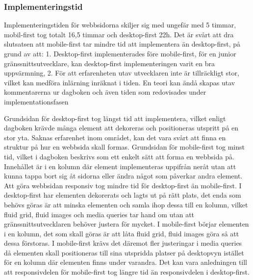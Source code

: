 \documentclass[11pt]{article}
\begin{document}
\subsubsection{Implementeringstid}
Implementeringstiden för webbsidorna skiljer sig med ungefär med 5 timmar, mobil-first tog totalt 16,5 timmar och desktop-first 22h. Det är svårt att dra slutsatsen att mobile-first tar mindre tid att implementera än desktop-first, på grund av att: 1. Desktop-first implementerades före mobile-first, för en junior gränssnittsutvecklare, kan desktop-first implementeringen varit en bra uppvärmning, 2. För att erfarenheten utav utvecklaren inte är tillräckligt stor, vilket kan medföra inlärning inräknat i tiden. En teori kan ändå skapas utav kommentarerna ur dagboken och även tiden som redovisades under implementationsfasen

Grundsidan för desktop-first tog längst tid att implementera, vilket enligt dagboken krävde många element att dekoreras och positioneras utspritt på en stor yta. Saknas erfarenhet inom området, kan det vara svårt att finna en struktur på hur en webbsida skall formas. Grundsidan för mobile-first tog minst tid, vilket i dagboken beskrivs som ett enkelt sätt att forma en webbsida på. Innehållet är i en kolumn där element implementeras uppifrån neråt utan att kunna tappa bort sig åt sidorna eller ändra något som påverkar andra element. Att göra webbsidan responsiv tog mindre tid för desktop-first än mobile-first. I desktop-first har elementen dekorerats och lagts ut på rätt plats, det enda som behövs göras är att minska elementen och samla ihop dessa till en kolumn, vilket fluid grid, fluid images och media queries tar hand om utan att gränssnittsutvecklaren behöver justera för mycket. I mobile-first börjar elementen i en kolumn, det som skall göras är att låta fluid grid, fluid images göra så att dessa förstoras. I mobile-first krävs det däremot fler justeringar i media queries då elementen skall positioneras till sina utspridda platser på desktopvyn istället för en kolumn där elementen finns under varandra. Det kan vara anledningen till att responsivdelen för mobile-first tog längre tid än responsivdelen i desktop-first.
\end{document}
